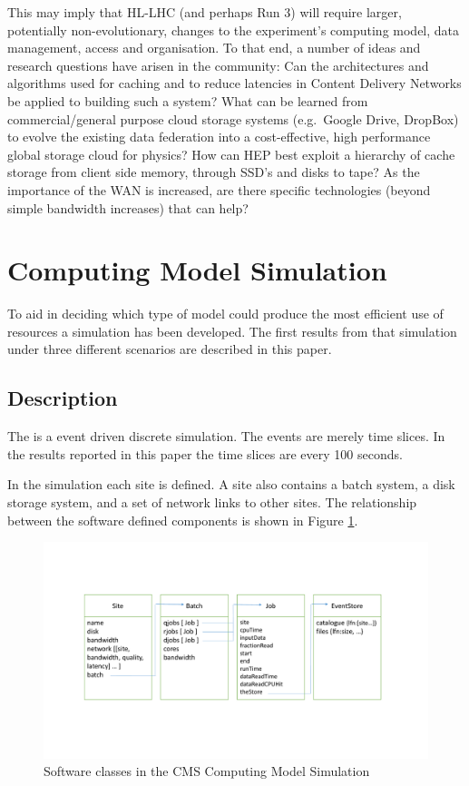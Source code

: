 \documentclass[a4paper]{jpconf}
\begin{document}
This may imply that HL-LHC (and perhaps Run 3) will
require larger, potentially non-evolutionary, changes to the
experiment's computing model, data management, access and organisation.
To that end, a number of ideas and research questions have arisen
in the community: Can the architectures and algorithms used for
caching and to reduce latencies in Content Delivery Networks be
applied to building such a system?  What can be learned from
commercial/general purpose cloud storage systems (e.g.\ Google
Drive, DropBox) to evolve the existing data federation into a
cost-effective, high performance global storage cloud for physics?
How can HEP best exploit a hierarchy of cache storage
from client side memory, through SSD's and disks to tape?  As the
importance of the WAN is increased, are there specific technologies
(beyond simple bandwidth increases) that can help?

\section{Computing Model Simulation}

To aid in deciding which type of model could produce the most
efficient use of resources a simulation has been developed. The first
results from that simulation under three different scenarios are
described in this paper.

\subsection{Description}

The 
is a event driven discrete simulation. The events are merely time
slices. In the results reported in this paper the time slices are
every 100 seconds.

In the simulation each site is defined. A site also contains a batch
system, a disk storage system, and a set of network links to other
sites. The relationship between the software defined components is
shown in Figure \ref{fig:classDiag}.

\begin{figure}
  \includegraphics[trim=100 140 100 130, clip, width=\textwidth]{figures/classDiag.pdf}
  \caption{Software classes in the CMS Computing Model
    Simulation\label{fig:classDiag}}
\end{figure}
\end{document}
